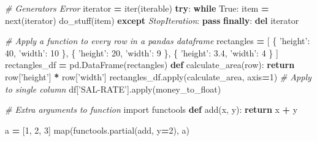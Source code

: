 \documentclass[]{book}
\newenvironment{Shaded}{\begin{snugshade}}{\end{snugshade}}
\newcommand{\KeywordTok}[1]{\textcolor[rgb]{0.13,0.29,0.53}{\textbf{#1}}}
\newcommand{\DecValTok}[1]{\textcolor[rgb]{0.00,0.00,0.81}{#1}}
\newcommand{\FloatTok}[1]{\textcolor[rgb]{0.00,0.00,0.81}{#1}}
\newcommand{\StringTok}[1]{\textcolor[rgb]{0.31,0.60,0.02}{#1}}
\newcommand{\ImportTok}[1]{#1}
\newcommand{\CommentTok}[1]{\textcolor[rgb]{0.56,0.35,0.01}{\textit{#1}}}
\newcommand{\VariableTok}[1]{\textcolor[rgb]{0.00,0.00,0.00}{#1}}
\newcommand{\ControlFlowTok}[1]{\textcolor[rgb]{0.13,0.29,0.53}{\textbf{#1}}}
\newcommand{\OperatorTok}[1]{\textcolor[rgb]{0.81,0.36,0.00}{\textbf{#1}}}
\newcommand{\BuiltInTok}[1]{#1}
\newcommand{\PreprocessorTok}[1]{\textcolor[rgb]{0.56,0.35,0.01}{\textit{#1}}}
\newcommand{\NormalTok}[1]{#1}
\theoremstyle{definition}
\theoremstyle{definition}
\theoremstyle{definition}
\theoremstyle{remark}
\begin{document}
\begin{Shaded}
\begin{Highlighting}[]
\CommentTok{# Generators Error}
\NormalTok{iterator }\OperatorTok{=} \BuiltInTok{iter}\NormalTok{(iterable)}
\ControlFlowTok{try}\NormalTok{:}
    \ControlFlowTok{while} \VariableTok{True}\NormalTok{:}
\NormalTok{        item }\OperatorTok{=} \BuiltInTok{next}\NormalTok{(iterator)}
\NormalTok{        do_stuff(item)}
\ControlFlowTok{except} \PreprocessorTok{StopIteration}\NormalTok{:}
    \ControlFlowTok{pass}
\ControlFlowTok{finally}\NormalTok{:}
    \KeywordTok{del}\NormalTok{ iterator}
\end{Highlighting}
\end{Shaded}

\begin{Shaded}
\begin{Highlighting}[]
\CommentTok{# Apply a function to every row in a pandas dataframe}
\NormalTok{rectangles }\OperatorTok{=}\NormalTok{ [}
\NormalTok{    \{ }\StringTok{'height'}\NormalTok{: }\DecValTok{40}\NormalTok{, }\StringTok{'width'}\NormalTok{: }\DecValTok{10}\NormalTok{ \},}
\NormalTok{    \{ }\StringTok{'height'}\NormalTok{: }\DecValTok{20}\NormalTok{, }\StringTok{'width'}\NormalTok{: }\DecValTok{9}\NormalTok{ \},}
\NormalTok{    \{ }\StringTok{'height'}\NormalTok{: }\FloatTok{3.4}\NormalTok{, }\StringTok{'width'}\NormalTok{: }\DecValTok{4}\NormalTok{ \}}
\NormalTok{]}
\NormalTok{rectangles_df }\OperatorTok{=}\NormalTok{ pd.DataFrame(rectangles)}
\KeywordTok{def}\NormalTok{ calculate_area(row):}
    \ControlFlowTok{return}\NormalTok{ row[}\StringTok{'height'}\NormalTok{] }\OperatorTok{*}\NormalTok{ row[}\StringTok{'width'}\NormalTok{]}
\NormalTok{rectangles_df.}\BuiltInTok{apply}\NormalTok{(calculate_area, axis}\OperatorTok{=}\DecValTok{1}\NormalTok{)}
\CommentTok{# Apply to single column}
\NormalTok{df[}\StringTok{'SAL-RATE'}\NormalTok{].}\BuiltInTok{apply}\NormalTok{(money_to_float)}
\end{Highlighting}
\end{Shaded}

\begin{Shaded}
\begin{Highlighting}[]
\CommentTok{# Extra arguments to function}
\ImportTok{import}\NormalTok{ functools}
\KeywordTok{def}\NormalTok{ add(x, y):}
    \ControlFlowTok{return}\NormalTok{ x }\OperatorTok{+}\NormalTok{ y}
    
\NormalTok{a }\OperatorTok{=}\NormalTok{ [}\DecValTok{1}\NormalTok{, }\DecValTok{2}\NormalTok{, }\DecValTok{3}\NormalTok{]}
\BuiltInTok{map}\NormalTok{(functools.partial(add, y}\OperatorTok{=}\DecValTok{2}\NormalTok{), a)}
\end{Highlighting}
\end{Shaded}
\end{document}
